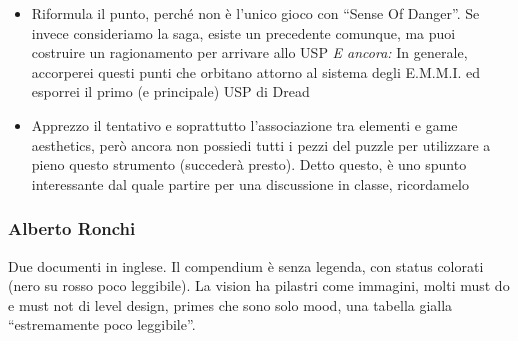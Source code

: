 {\begin{itemize}
  \item {} Riformula il punto, perché non è l'unico gioco con ``Sense Of Danger''. Se invece consideriamo la saga, esiste un precedente comunque, ma puoi costruire un ragionamento per arrivare allo USP \emph{E ancora:} In generale, accorperei questi punti che orbitano attorno al sistema degli E.M.M.I. ed esporrei il primo (e principale) USP di Dread
  \item {} Apprezzo il tentativo e soprattutto l'associazione tra elementi e game aesthetics, però ancora non possiedi tutti i pezzi del puzzle per utilizzare a pieno questo strumento (succederà presto). Detto questo, è uno spunto interessante dal quale partire per una discussione in classe, ricordamelo
\end{itemize}
}

\subsubsection{Alberto Ronchi}
Due documenti in inglese. Il compendium è senza legenda, con status colorati (nero su rosso poco leggibile). La vision ha pilastri come immagini, molti must do e must not di level design, primes che sono solo mood, una tabella gialla ``estremamente poco leggibile''.
